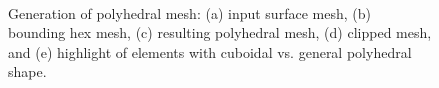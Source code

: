 \begin{figure}
{\label{fig:cel3}}
\\		
\caption{Generation of polyhedral mesh: (a) input surface mesh, (b) bounding hex mesh,  (c) resulting polyhedral mesh, (d) clipped mesh, and (e) highlight of elements with cuboidal vs. general polyhedral shape.}
\label{fig:cel}
\end{figure}

